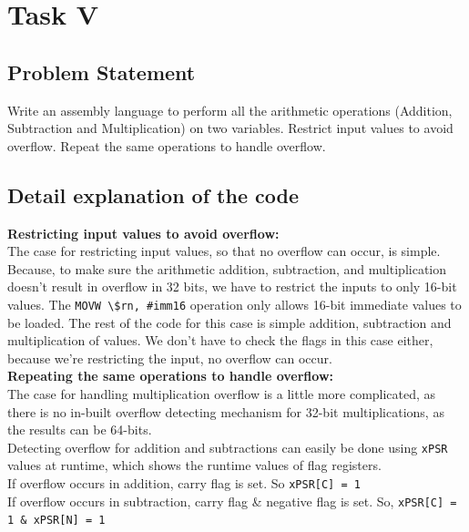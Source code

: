 \documentclass[footheight=20pt, footsepline, headheight=20pt, headsepline]{scrartcl}
\begin{document}
\FloatBarrier
\section*{Task V}
\subsection*{Problem Statement}
Write an assembly language to perform all the arithmetic operations (Addition, Subtraction and Multiplication) on two variables. Restrict input values to avoid overflow. Repeat the same operations to handle overflow.
\subsection*{Detail explanation of the code}
\textbf{Restricting input values to avoid overflow:}\\
The case for restricting input values, so that no overflow can occur, is simple. Because, to make sure the arithmetic addition, subtraction, and multiplication doesn't result in overflow in 32 bits, we have to restrict the inputs to only 16-bit values. The \verb |MOVW \$rn, #imm16| operation only allows 16-bit immediate values to be loaded. The rest of the code for this case is simple addition, subtraction and multiplication of values. We don't have to check the flags in this case either, because we're restricting the input, no overflow can occur.\\
\textbf{Repeating the same operations to handle overflow:}\\
The case for handling multiplication overflow is a little more complicated, as there is no in-built overflow detecting mechanism for 32-bit multiplications, as the results can be 64-bits.\\ 
Detecting overflow for addition and subtractions can easily be done using \verb|xPSR| values at runtime, which shows the runtime values of flag registers.\\ 
If overflow occurs in addition, carry flag is set. So \verb|xPSR[C] = 1|\\
If overflow occurs in subtraction, carry flag \& negative flag is set. So,  \verb|xPSR[C] = 1 & xPSR[N] = 1|\\
\end{document}
